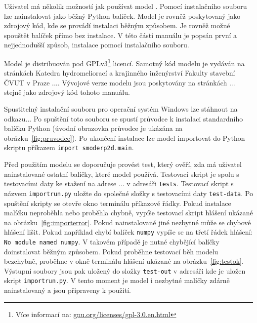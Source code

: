   
  Uživatel má několik možností jak používat model \smod. Pomocí instalačního souboru lze nainstalovat \smod jako běžný Python balíček. Model \smod je rovněž poskytovaný jako zdrojový kód, kde se provádí instalaci běžným způsobem. Je rovněž možné spouštět balíček přímo bez instalace. V této částí manuálu je popsán první a nejjednodušší způsob, instalace pomocí instalačního souboru. 
  
  Model \smod je distribuován pod GPLv3\footnote{Více informací na: \href{https://www.gnu.org/licenses/gpl-3.0.en.html}{gnu.org/licenses/gpl-3.0.en.html}} licencí. Samotný kód modelu \smod je vydáván na stránkách  Katedra  hydromeliorací a krajinného inženýrství Fakulty stavební ČVUT v Praze .... Vývojové verze modelu jsou poskytovány na stránkách ... stejně jako zdrojový kód tohoto manuálu. 
  
  Spustitelný instalační souboru pro operační systém Windows lze stáhnout na odkazu... Po spuštění toto souboru se spustí průvodce k instalaci standardního balíčku Python (úvodní obrazovka průvodce je ukázána na obrázku~\ref{fig:pruvodce}). Po ukončení instalace lze model \smod importovat do Python skriptu příkazem {\tt import smoderp2d.main}. 

  Před použitím modelu se doporučuje provést test, který ověří, zda má uživatel nainstalované ostatní balíčky, které model \smod používá. Testovací skript je spolu s testovacími daty ke stažení na adrese ... v adresáři {\tt tests}. Testovací skript s názvem {\tt importrun.py} uložte do společné složky s testovacími daty {\tt test-data}. Po spuštění skripty se otevře okno terminálu příkazové řádky. Pokud instalace malíčku \smod neproběhla nebo proběhla chybně, vypíše testovací skript hlášení ukázané na obrázku~\ref{fig:importerror}. Pokud nainstalované jiné nezbytné může se chybové hlášení lišit. Pokud například chybí balíček {\tt numpy} vypíše se na třetí řádek hlášení: {\tt No module named numpy}. V takovém případě je nutné chybějící balíčky doinstalovat běžným způsobem. Pokud proběhne testovací běh modelu \smod bezchybně, proběhne v okně terminálu hlášení ukázané na obrázku~\ref{fig:testok}. Výstupní soubory jsou pak uložený do složky {\tt test-out} v adresáři kde je uložen skript {\tt importrun.py}. V tento moment je model \smod i nezbytné malíčky zdárně nainstalovaný a jsou připraveny k použití.
  
